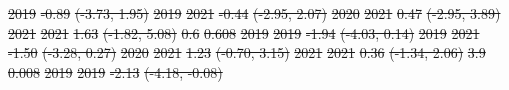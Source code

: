 \documentclass[
  letterpaper,
  DIV=11,
  numbers=noendperiod]{scrartcl}
\providecommand{\DIFdeltex}[1]{{\protect\color{red}\sout{#1}}}                      %
\providecommand{\DIFdelFL}[1]{\DIFdel{#1}} %
\providecommand{\DIFdel}[1]{\texorpdfstring{\DIFdeltex{#1}}{}} %
\begin{document}
\DIFdelFL{2019 }%
\DIFdelFL{-0.89 }%
\DIFdelFL{(-3.73, 1.95) }%
\DIFdelFL{\hspace{1em}2019 }%
\DIFdelFL{2021 }%
\DIFdelFL{-0.44 }%
\DIFdelFL{(-2.95, 2.07) }%
\DIFdelFL{\hspace{1em}2020 }%
\DIFdelFL{2021 }%
\DIFdelFL{0.47 }%
\DIFdelFL{(-2.95, 3.89) }%
\DIFdelFL{\hspace{1em}2021 }%
\DIFdelFL{2021 }%
\DIFdelFL{1.63 }%
\DIFdelFL{(-1.82, 5.08) }%
\DIFdelFL{0.6 }%
\DIFdelFL{0.608}%
\DIFdelFL{\hspace{1em}2019 }%
\DIFdelFL{2019 }%
\DIFdelFL{-1.94 }%
\DIFdelFL{(-4.03, 0.14) }%
\DIFdelFL{\hspace{1em}2019 }%
\DIFdelFL{2021 }%
\DIFdelFL{-1.50 }%
\DIFdelFL{(-3.28, 0.27) }%
\DIFdelFL{\hspace{1em}2020 }%
\DIFdelFL{2021 }%
\DIFdelFL{1.23 }%
\DIFdelFL{(-0.70, 3.15) }%
\DIFdelFL{\hspace{1em}2021 }%
\DIFdelFL{2021 }%
\DIFdelFL{0.36 }%
\DIFdelFL{(-1.34, 2.06) }%
\DIFdelFL{3.9 }%
\DIFdelFL{0.008}%
\DIFdelFL{\hspace{1em}2019 }%
\DIFdelFL{2019 }%
\DIFdelFL{-2.13 }%
\DIFdelFL{(-4.18, -0.08) }%
\end{document}

